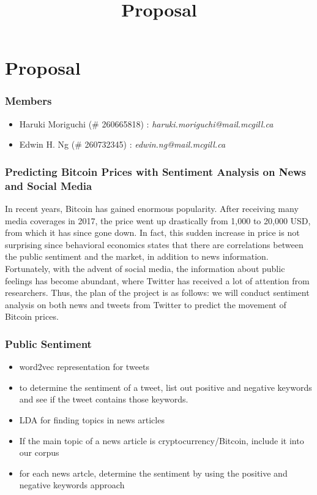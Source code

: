 \documentclass[12pt,a4paper]{report}
\begin{document}
\title{Proposal\\
}


\setcounter{page}{1}
\thispagestyle{empty} 


\chapter*{Proposal}
\subsection*{Members}
\begin{itemize}
\item Haruki Moriguchi (\# 260665818) : \textit{haruki.moriguchi@mail.mcgill.ca}
\item Edwin H. Ng (\# 260732345) : \textit{edwin.ng@mail.mcgill.ca}
\end{itemize}

\subsection*{Predicting Bitcoin Prices with Sentiment Analysis on News and Social Media}
\par \qquad In recent years, Bitcoin has gained enormous popularity. After receiving many media coverages in 2017, the  price went up drastically from 1,000 to 20,000 USD, from which it has since gone down. In fact, this sudden increase in price is not surprising since behavioral economics states that there are correlations between the public sentiment and the market, in addition to news information. Fortunately, with the advent of social media, the information about public feelings has become abundant, where Twitter has received a lot of attention from researchers. Thus, the plan of the project is as follows: we will conduct sentiment analysis on both news and tweets from Twitter to predict the movement of Bitcoin prices.
\\

\subsection*{Public Sentiment}
\begin{itemize}
	\item word2vec representation for tweets
	\item to determine the sentiment of a tweet, list out positive and negative keywords and see if the tweet contains those keywords.
	\item LDA for finding topics in news articles
	\item If the main topic of a news article is cryptocurrency/Bitcoin, include it into our corpus
	\item for each news artcle, determine the sentiment by using the positive and negative keywords approach
\end{itemize}
\end{document}
